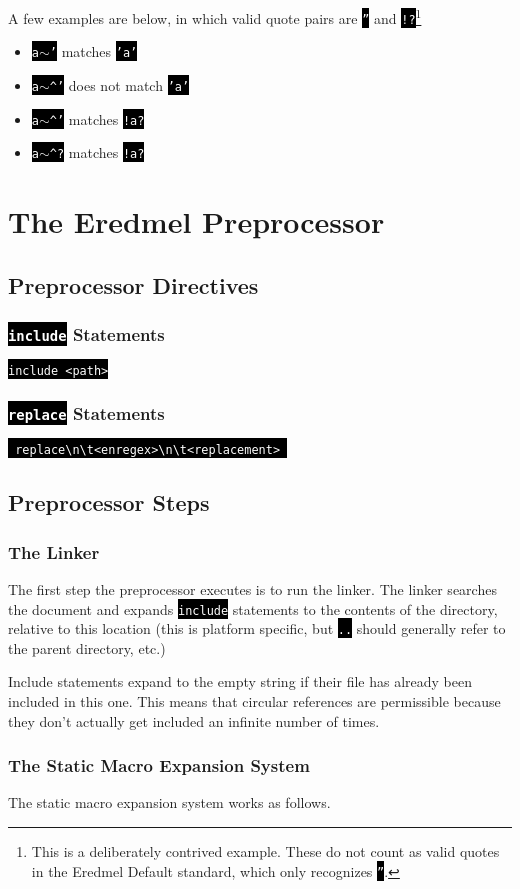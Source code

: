 \documentclass{book}
\newcommand\code\texttt
\newcommand{\codebox}[1]{\leavevmode\colorbox{black}{\textcolor{white}{\code{#1}}}}
\newcommand{\bak}{\textbackslash}
\newcommand{\til}{$\sim$}
\newcommand{\tab}{\bak{}t}
\begin{document}
A few examples are below, in which valid quote pairs are \codebox{''} and \codebox{!?}\footnote{This is a deliberately contrived example. These do not count as valid quotes in the Eredmel Default standard, which only recognizes \codebox{''}.}

\begin{itemize}
\item \codebox{a\til'} matches \codebox{'a'}
\item \codebox{a\til\^{}'} does not match \codebox{'a'}
\item \codebox{a\til\^{}'} matches \codebox{!a?}
\item \codebox{a\til\^{}?} matches \codebox{!a?}
\end{itemize}

\chapter{The Eredmel Preprocessor}

\section{Preprocessor Directives}

\subsection{\codebox{include} Statements}

\codebox{include <path>}

\subsection{\codebox{replace} Statements}

\codebox{
replace\bak{}n\tab<enregex>\bak{n}\tab<replacement>
}

\section{Preprocessor Steps}

\subsection{The Linker}

The first step the preprocessor executes is to run the linker. The linker searches the document and expands \codebox{include} statements to the contents of the directory, relative to this location (this is platform specific, but \codebox{..} should generally refer to the parent directory, etc.)

Include statements expand to the empty string if their file has already been included in this one. This means that circular references are permissible because they don't actually get included an infinite number of times.

\subsection{The Static Macro Expansion System}

The static macro expansion system works as follows. 
\end{document}
